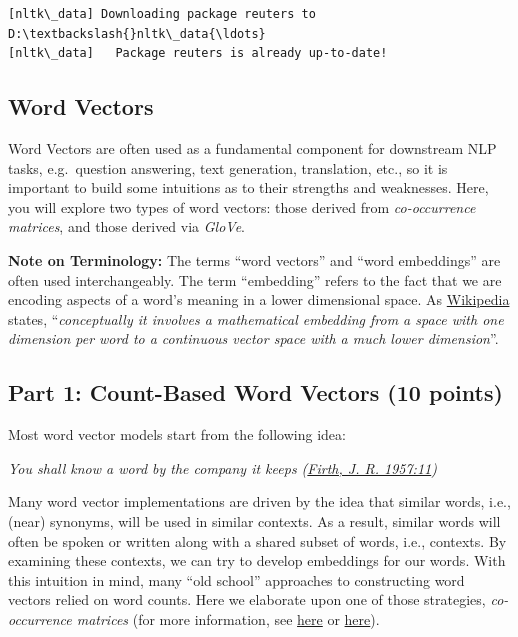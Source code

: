 \documentclass[11pt]{article}
\begin{document}
    \begin{Verbatim}[commandchars=\\\{\}]
[nltk\_data] Downloading package reuters to D:\textbackslash{}nltk\_data{\ldots}
[nltk\_data]   Package reuters is already up-to-date!
    \end{Verbatim}

    \hypertarget{word-vectors}{%
\subsection{Word Vectors}\label{word-vectors}}

Word Vectors are often used as a fundamental component for downstream
NLP tasks, e.g.~question answering, text generation, translation, etc.,
so it is important to build some intuitions as to their strengths and
weaknesses. Here, you will explore two types of word vectors: those
derived from \emph{co-occurrence matrices}, and those derived via
\emph{GloVe}.

\textbf{Note on Terminology:} The terms ``word vectors'' and ``word
embeddings'' are often used interchangeably. The term ``embedding''
refers to the fact that we are encoding aspects of a word's meaning in a
lower dimensional space. As
\href{https://en.wikipedia.org/wiki/Word_embedding}{Wikipedia} states,
``\emph{conceptually it involves a mathematical embedding from a space
with one dimension per word to a continuous vector space with a much
lower dimension}''.

    \hypertarget{part-1-count-based-word-vectors-10-points}{%
\subsection{Part 1: Count-Based Word Vectors (10
points)}\label{part-1-count-based-word-vectors-10-points}}

Most word vector models start from the following idea:

\emph{You shall know a word by the company it keeps
(\href{https://en.wikipedia.org/wiki/John_Rupert_Firth}{Firth, J. R.
1957:11})}

Many word vector implementations are driven by the idea that similar
words, i.e., (near) synonyms, will be used in similar contexts. As a
result, similar words will often be spoken or written along with a
shared subset of words, i.e., contexts. By examining these contexts, we
can try to develop embeddings for our words. With this intuition in
mind, many ``old school'' approaches to constructing word vectors relied
on word counts. Here we elaborate upon one of those strategies,
\emph{co-occurrence matrices} (for more information, see
\href{http://web.stanford.edu/class/cs124/lec/vectorsemantics.video.pdf}{here}
or
\href{https://medium.com/data-science-group-iitr/word-embedding-2d05d270b285}{here}).
\end{document}
